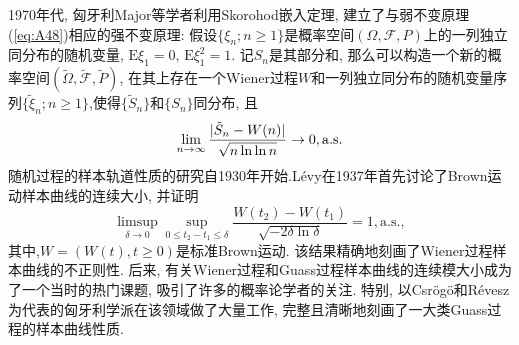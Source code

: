 1970年代, 匈牙利Major等学者利用Skorohod嵌入定理, 建立了与弱不变原理(\ref{eq:A48})相应的强不变原理: 假设$\{\xi_n;n\geqslant 1\}$是概率空间$(\Omega,\mathscr{F},P)$上的一列独立同分布的随机变量, $\mathrm{E}\xi_1= 0$, $\mathrm{E}\xi_1^2 = 1$. 记$S_n$是其部分和, 那么可以构造一个新的概率空间$(\tilde{\Omega},\tilde{\mathscr{F}},\tilde{P})$, 在其上存在一个Wiener过程$W$和一列独立同分布的随机变量序列$\{ \tilde{\xi}_n;n\geqslant 1 \}$,使得$\{\tilde{S}_n\}$和$\{S_n\}$同分布, 且\begin{equation}\label{eq:A51}
\lim_{n\to\infty}\frac{\lvert\tilde{S}_n-W(n)\rvert}{\sqrt{n\ln\ln n}}\to 0 ,\mathrm{a.s.}
\end{equation}
随机过程的样本轨道性质的研究自1930年开始.Lévy在1937年首先讨论了Brown运动样本曲线的连续大小, 并证明\begin{equation}\label{eq:A52}
\limsup_{\delta\to 0}\sup_{0\leqslant t_2-t_1\leqslant \delta}\frac{W(t_2)-W(t_1)}{\sqrt{-2\delta\ln\delta}} = 1,\mathrm{a.s.},
\end{equation}
其中,$W = (W(t),t\geqslant 0)$是标准Brown运动. 该结果精确地刻画了Wiener过程样本曲线的不正则性. 后来, 有关Wiener过程和Guass过程样本曲线的连续模大小成为了一个当时的热门课题, 吸引了许多的概率论学者的关注. 特别, 以Csrögö和Révesz为代表的匈牙利学派在该领域做了大量工作, 完整且清晰地刻画了一大类Guass过程的样本曲线性质.
